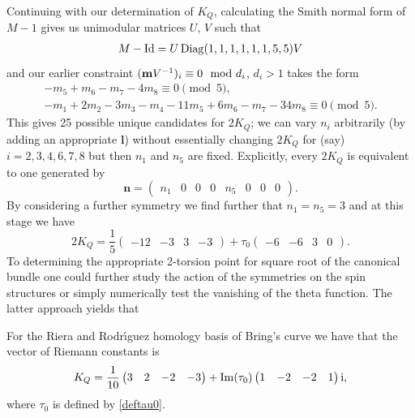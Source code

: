 \documentclass[pdftex]{sigma}
\numberwithin{equation}{section}
\def\Im{\mathop{\rm Im}\nolimits}
\def\diag{\mathop{\rm Diag}\nolimits}
\def\id{\mathop{\rm Id}\nolimits}
\newcommand{\mi}{\mathrm{i}}
\renewcommand{\vec}[1]{\mathbf{#1}}
\begin{document}
Continuing with our determination of $K_Q$, calculating the
Smith normal form of $M-1$ gives us unimodular
matrices $U$, $V$ such that
\begin{gather*}
  M - \id  = U\diag(1, 1, 1, 1, 1, 1, 5, 5) V
\end{gather*}
and our earlier constraint
$(\mathbf{m}V\sp{-1})_i\equiv0 \mod d_i$, $d_i>1$
takes the form
\begin{gather*}
  -m_5 +  m_6 - m_7 - 4m_8  \equiv 0 \pmod{5}, \\
  -m_1 + 2m_2 - 3m_3 - m_4 - 11m_5 + 6m_6 - m_7 - 34m_8  \equiv 0 \pmod{5}.
\end{gather*}
This gives 25 possible unique candidates for $2K_Q$; we can vary
$n_i$ arbitrarily (by adding an appropriate $\vec{l}$) without
essentially changing $2K_Q$ for (say) $i=2,3,4,6,7,8$ but then $n_1$
and $n_5$ are f\/ixed. Explicitly, every $2K_Q$ is equivalent to one
generated by
\[
  \vec{n} =
  \begin{pmatrix}
    n_1 & 0 & 0 & 0 & n_5 & 0 & 0 & 0
  \end{pmatrix}.
\]
By considering a further symmetry we f\/ind further that
$n_1 = n_5 = 3$ and at this stage we have
\begin{displaymath}
  2K_Q = \frac{1}{5}
  \begin{pmatrix}
    -12 & -3 & 3 & -3
  \end{pmatrix}
  + \tau_0
  \begin{pmatrix}
    -6 & -6 & 3 & 0
  \end{pmatrix}.
\end{displaymath}
To determining the appropriate 2-torsion point for square root of the canonical
bundle one could further study the action of the symmetries on the spin structures
or simply numerically test the vanishing of the theta function. The latter approach yields
that
\begin{theorem} For the Riera and Rodr{\'{\i}}guez homology basis of Bring's curve we have that the vector of
Riemann constants is
\begin{equation*}
    K_Q = \frac{1}{10}
    \begin{pmatrix}
      3 & 2 & -2 & -3
    \end{pmatrix}
    +
    \Im(\tau_0)
    \begin{pmatrix}
      1 & -2 & -2 & 1
    \end{pmatrix}\mi,
  \end{equation*}
where $\tau_0$ is defined by \eqref{deftau0}.
\end{theorem}
\end{document}
